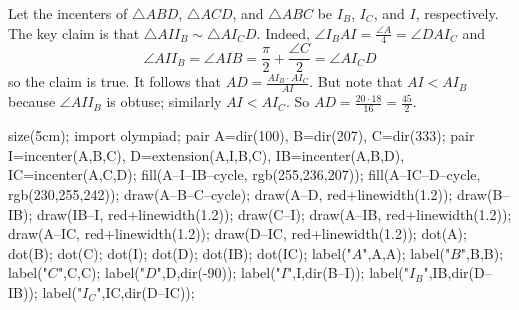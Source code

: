 Let the incenters of $\triangle{ABD}$, $\triangle{ACD}$, and $\triangle{ABC}$ be $I_B$, $I_C$, and $I$, respectively. The key claim is that $\triangle{AII_B}\sim\triangle{AI_CD}$. Indeed, $\angle{I_BAI}=\frac{\angle{A}}{4}=\angle{DAI_C}$ and
	\[
		\angle{AII_B}=\angle{AIB}=\frac{\pi}{2}+\frac{\angle{C}}{2}=\angle{AI_CD}
	\]
	so the claim is true. It follows that $AD=\frac{AI_B\cdot AI_C}{AI}$. But note that $AI<AI_B$ because $\angle{AII_B}$ is obtuse; similarly $AI<AI_C$. So $AD=\frac{20\cdot18}{16}=\frac{45}{2}$.
	\begin{center}
		\begin{asy}
			size(5cm);
			import olympiad;
			pair A=dir(100), B=dir(207), C=dir(333);
			pair I=incenter(A,B,C), D=extension(A,I,B,C), IB=incenter(A,B,D), IC=incenter(A,C,D);
			fill(A--I--IB--cycle, rgb(255,236,207));
			fill(A--IC--D--cycle, rgb(230,255,242));
			draw(A--B--C--cycle); draw(A--D, red+linewidth(1.2)); draw(B--IB); draw(IB--I, red+linewidth(1.2)); draw(C--I); draw(A--IB, red+linewidth(1.2)); draw(A--IC, red+linewidth(1.2)); draw(D--IC, red+linewidth(1.2));
			dot(A); dot(B); dot(C); dot(I); dot(D); dot(IB); dot(IC);
			label("$A$",A,A); label("$B$",B,B); label("$C$",C,C); label("$D$",D,dir(-90)); label("$I$",I,dir(B--I)); label("$I_B$",IB,dir(D--IB)); label("$I_C$",IC,dir(D--IC));
		\end{asy}
	\end{center}